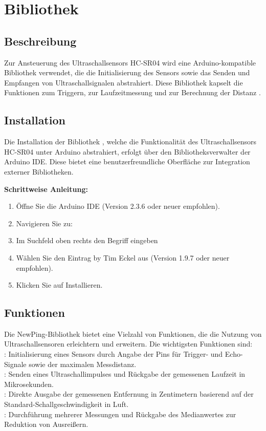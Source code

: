 \section{Bibliothek}

\subsection{Beschreibung}
Zur Ansteuerung des Ultraschallsensors HC-SR04 wird eine Arduino-kompatible Bibliothek
 verwendet, die die Initialisierung des Sensors sowie das Senden und Empfangen von
Ultraschallsignalen abstrahiert. Diese Bibliothek kapselt die Funktionen zum Triggern, zur
Laufzeitmessung und zur Berechnung der Distanz \cite{ArduinoDoc:2024}.

\subsection{Installation}
Die Installation der Bibliothek , welche die Funktionalität des Ultraschallsensors HC-SR04 unter Arduino abstrahiert, erfolgt über den Bibliotheksverwalter der Arduino IDE. Diese
bietet eine benutzerfreundliche Oberfläche zur Integration externer Bibliotheken.
\cite{ArduinoDoc:2024}

\textbf{Schrittweise Anleitung:}
\begin{enumerate}
	\item Öffne Sie die Arduino IDE (Version 2.3.6 oder neuer empfohlen).
	\item Navigieren Sie zu: 
	\item Im Suchfeld oben rechts den Begriff  eingeben
	\item Wählen Sie den Eintrag  by Tim Eckel aus (Version 1.9.7 oder neuer empfohlen).
	\item Klicken Sie auf \glqq Installieren\grqq.
\end{enumerate}

\subsection{Funktionen}
Die NewPing-Bibliothek bietet eine Vielzahl von Funktionen, die die Nutzung von Ultraschallsensoren erleichtern und erweitern. Die wichtigsten Funktionen sind: \cite{ArduinoDoc:2024}\\

: Initialisierung eines Sensors durch Angabe der Pins für Trigger- und Echo-Signale sowie der maximalen Messdistanz.\\
: Senden eines Ultraschallimpulses und Rückgabe der gemessenen Laufzeit in Mikrosekunden.\\
: Direkte Ausgabe der gemessenen Entfernung in Zentimetern basierend auf der Standard-Schallgeschwindigkeit in Luft.\\
: Durchführung mehrerer Messungen und Rückgabe des Medianwertes zur Reduktion von Ausreißern.\\

